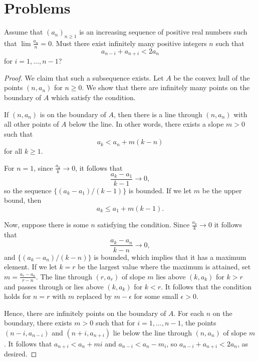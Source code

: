 \documentclass[11pt]{scrartcl}
\begin{document}
\section{Problems}
\begin{prob}[Putnam 2001 B6] Assume that $(a_n)_{n \ge 1}$ is an increasing sequence of positive real numbers such that $\lim \frac{a_n}{n} = 0$.  Must there exist infinitely many positive integers $n$ such that 
$$a_{n-i} + a_{n+i} < 2a_n$$
for $i = 1, \dots, n-1$?
\end{prob}
\begin{proof}
We claim that such a subsequence exists.  Let $A$ be the convex hull of the points $(n, a_n)$ for $n \ge 0$.  We show that there are infinitely many points on the boundary of $A$ which satisfy the condition.  

If $(n, a_n)$ is on the boundary of $A$, then there is a line through $(n, a_n)$ with all other points of $A$ below the line.  In other words, there exists a slope $m > 0$ such that $$a_k < a_n + m(k-n)$$
for all $k \ge 1$.  

For $n = 1$, since $\frac{a_k}{k} \to 0$, it follows that $$\frac{a_k-a_1}{k-1} \to 0,$$
so the sequence $\{(a_k - a_1)/(k-1)\}$ is bounded.  If we let $m$ be the upper bound, then $$a_k \le a_1 + m(k-1).$$

Now, suppose there is some $n$ satisfying the condition.  Since $\frac{a_k}{k} \to 0$ it follows that 
$$\frac{a_k-a_n}{k-n} \to 0,$$
and $\{(a_k - a_n)/(k-n)\}$ is bounded, which implies that it has a maximum element.  If we let $k = r$ be the largest value where the maximum is attained, set $m = \frac{a_r - a_n}{r-n}$.  The line through $(r, a_r)$ of slope $m$ lies above $(k, a_k)$ for $k > r$ and passes through or lies above $(k, a_k)$ for $k < r$.  It follows that the condition holds for $n = r$ with $m$ replaced by $m - \epsilon$ for some small $\epsilon>0$.

Hence, there are infinitely points on the boundary of $A$.  For each $n$ on the boundary, there exists $m > 0$ such that for $i = 1, \dots, n-1$, the points $(n-i, a_{n-i})$ and $(n+i, a_{n+i})$ lie below the line through $(n, a_n)$ of slope $m$.  It follows that $a_{n+i} < a_n + mi$ and $a_{n-i} < a_n - m_i$, so $a_{n-i} + a_{n+i} < 2a_n$, as desired.
\end{proof}
\end{document}

